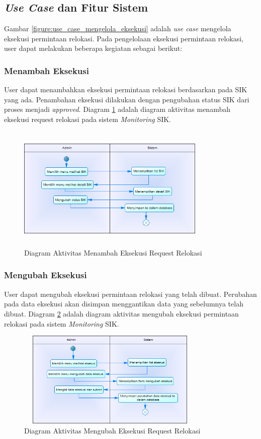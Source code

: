 \subsection{\textit{Use Case} dan Fitur Sistem}
Gambar \ref{figure:use_case_mengelola_eksekusi} adalah \textit{use case} mengelola eksekusi permintaan relokasi. Pada pengelolaan eksekusi permintaan relokasi, user dapat melakukan beberapa kegiatan sebagai berikut:
	\subsubsection{Menambah Eksekusi}
	User dapat menambahkan eksekusi permintaan relokasi berdasarkan pada SIK yang ada. Penambahan eksekusi dilakukan dengan pengubahan status SIK dari proses menjadi \textit{approved}. Diagram \ref{figure:activity_menambah_eksekusi} adalah diagram aktivitas menambah eksekusi request relokasi pada sistem \textit{Monitoring} SIK.
	\begin{figure}[h]
	\centerline {\includegraphics[width=9cm,height=6cm]{bab4/ActivityDiagram_MenambahkanEksekusi.png}}
	\caption{Diagram Aktivitas Menambah Eksekusi Request Relokasi}
	\label{figure:activity_menambah_eksekusi}
	\end{figure}
		
	\subsubsection{Mengubah Eksekusi}
	User dapat mengubah eksekusi permintaan relokasi yang telah dibuat. Perubahan pada data eksekusi akan disimpan menggantikan data yang sebelumnya telah dibuat. Diagram \ref{figure:activity_mengubah_eksekusi} adalah diagram aktivitas mengubah eksekusi permintaan relokasi pada sistem \textit{Monitoring} SIK.
	\begin{figure}[h]
	\centerline {\includegraphics[width=9cm,height=4.6cm]{bab4/ActivityDiagram_MengubahEksekusi.png}}
	\caption{Diagram Aktivitas Mengubah Eksekusi Request Relokasi}
	\label{figure:activity_mengubah_eksekusi}
	\end{figure}

